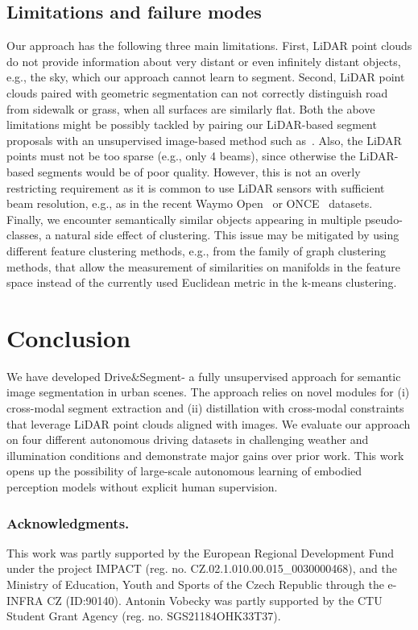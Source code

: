 \documentclass[runningheads]{llncs}
\newcommand{\ours}{Drive$\&$Segment\xspace}
\begin{document}
\vspace{-5pt}
\subsection{Limitations and failure modes}
Our approach has the following three main limitations.
First, LiDAR point clouds do not provide information about very distant or even infinitely distant objects, e.g., the sky, which our approach cannot learn to segment.
Second, LiDAR point clouds paired with geometric segmentation can not correctly distinguish road from sidewalk or grass, when all surfaces are similarly flat. Both the above limitations might be possibly tackled by pairing our LiDAR-based segment proposals with an unsupervised image-based method such as~\cite{felzenszwalb2004efficient}. 
Also, the LiDAR points must not be too sparse (e.g., 
only 4 beams), since otherwise the LiDAR-based segments would be of poor quality. However, this is not an overly restricting requirement as it is common 
to use LiDAR sensors with sufficient beam resolution, e.g., as in the recent Waymo Open~\cite{sun2020scalability} or ONCE~\cite{mao2021one} datasets.
Finally, we encounter semantically similar objects appearing in multiple pseudo-classes, a natural side effect of clustering. This issue may be mitigated by using different feature clustering methods, e.g., from the family of graph clustering methods, that allow the measurement of similarities on manifolds in the feature space instead of the currently used Euclidean metric in the k-means clustering. 
\vspace{-8pt}
\section{Conclusion}
We have developed \ours - a fully unsupervised approach for semantic image segmentation in urban scenes. The approach relies on novel modules for (i) cross-modal segment extraction and (ii) distillation with cross-modal constraints that leverage LiDAR point clouds aligned with images. We evaluate our approach on four different autonomous driving datasets in challenging weather and illumination conditions and demonstrate major gains over prior work. This work opens up the possibility of large-scale autonomous learning of embodied perception models without explicit human supervision. 
 

\subsubsection{Acknowledgments.}
This work was partly supported by the European Regional Development Fund under the project IMPACT (reg. no. CZ.02.1.01\/0.0\/0.0\/15\_003\/0000468), and the Ministry of Education, Youth and Sports of the Czech Republic through the e-INFRA CZ (ID:90140). Antonin Vobecky was partly supported by the CTU Student Grant Agency (reg. no. SGS21\/184\/OHK3\/3T\/37). 
\end{document}

